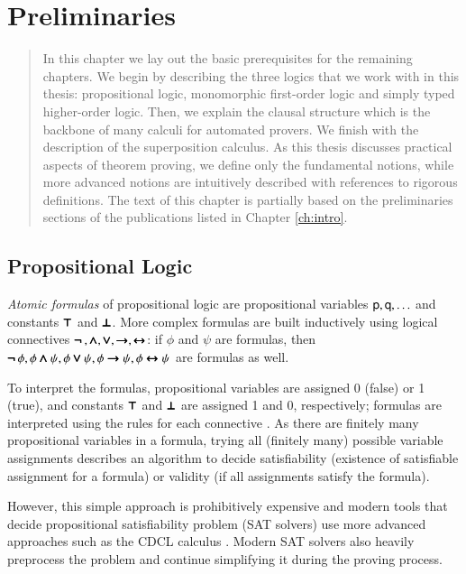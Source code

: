 \chapter{Preliminaries}
\label{ch:pre}

\begin{abstract}
    In this chapter we lay out the basic prerequisites for the remaining
    chapters. We begin by describing the three logics that we work with in this
    thesis: propositional logic, monomorphic first-order logic and simply typed
    higher-order logic. Then, we explain the clausal structure which is the
    backbone of many calculi for automated provers. We finish with the
    description of the superposition calculus. As this thesis discusses practical
    aspects of theorem proving, we define only the fundamental notions, while
    more advanced notions are intuitively described with references to rigorous
    definitions. The text of this chapter is
    partially based on the preliminaries sections of the publications listed in
    Chapter \ref{ch:intro}.
    
\end{abstract}
      
\newpage


\section{Propositional Logic}

\emph{Atomic formulas} of propositional logic are propositional variables
$\mathsf{p}, \mathsf{q}, \ldots$ and constants $\pmb\top$ and $\pmb\bot$. More complex
formulas are built inductively using logical connectives $\pmb{\neg\,}, \pmb\land, \pmb\lor,
\pmb\rightarrow, \allowbreak \pmb\leftrightarrow$: if $\phi$ and $\psi$ are formulas, then $\pmb{\neg\,} \phi, \phi \pmb\land
\psi, \allowbreak \phi \pmb\lor \psi, \phi \pmb\rightarrow \psi, \phi \pmb\leftrightarrow \psi$ are formulas as well.

To interpret the formulas, propositional variables are assigned 0 (false) or 1
(true), and constants $\pmb\top$ and $\pmb\bot$ are assigned 1 and 0, respectively; formulas are interpreted using the rules for each connective
\cite[Sect.~1.4]{hr-00-logic-in-cs}. As there are finitely many propositional
variables in a formula, trying all (finitely many) possible variable assignments
describes an algorithm to decide satisfiability (existence of satisfiable
assignment for a formula) or validity (if all assignments satisfy the formula).

However, this simple approach is prohibitively expensive and modern tools that
decide propositional satisfiability problem (SAT solvers) use more advanced
approaches such as the CDCL calculus \cite{mss-96-cdcl}. Modern SAT solvers also
heavily preprocess the problem and continue simplifying it during the proving
process.

